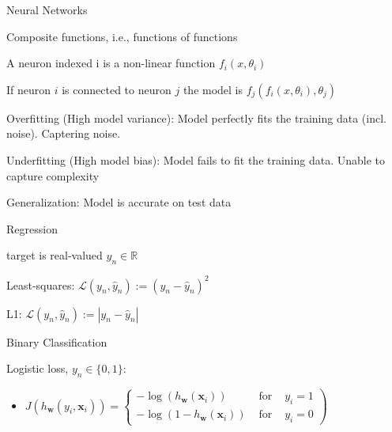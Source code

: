 \documentclass[landscape, a4paper]{article}
\begin{document}
\begin{minipage}[t]{0.2\linewidth}
\begin{betterlist}
\begin{betterlist}
\begin{betterlist}
			\end{betterlist}
			\item Neural Networks
			\begin{betterlist}
				\item Composite functions, i.e., functions of functions
				\item A neuron indexed i is a non-linear function $f_i(x, \theta_i)$
				\item If neuron $i$ is connected to neuron $j$ the model is $f_j (f_i (x, \theta_i ), \theta_j)$
			\end{betterlist}
		\end{betterlist}
	\end{betterlist}
		\begin{betterlist}
			\item \alert{Overfitting} (High model variance): Model perfectly fits the training data (incl. noise). Captering noise.
			\item \alert{Underfitting} (High model bias): Model fails to fit the training data. Unable to capture complexity
			\item \alert{Generalization}: Model is accurate on test data
		\end{betterlist}
		\begin{betterlist}
			\item Regression
			\begin{betterlist}
				\item target is real-valued $y_n\in \mathbb{R}$
				\item \alert{Least-squares:} $\mathcal{L}(y_n, \hat y_n) := (y_n - \hat y_n)^2$
				\item \alert{L1:} $\mathcal{L}(y_n, \hat y_n) := |y_n - \hat y_n|$
			\end{betterlist}
			\item Binary Classification
			\begin{betterlist}
				\item \alert{Logistic loss}, $y_n\in\{0, 1\}$:
				\begin{itemize}
					\item $J\left(h_{\mathbf{w}}\left(y_i, \mathbf{x}_i\right)\right)=\left\{\begin{array}{rll}
							-\log \left(h_{\mathbf{w}}\left(\mathbf{x}_i\right)\right)   & \text { for } & y_i=1 \\
							-\log \left(1-h_{\mathbf{w}}\left(\mathbf{x}_i\right)\right) & \text { for } & y_i=0\end{array}\right)$

\end{itemize}
\end{betterlist}
\end{betterlist}
\end{minipage}
\end{document}
